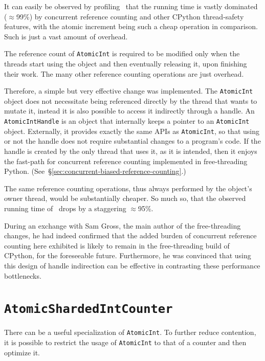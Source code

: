 It can easily be observed by profiling~\cite[examples/atomic\_int/counter.py]{cereggii} that the running time is vastly dominated ($\approx$99\%) by concurrent reference counting and other CPython thread-safety features, with the atomic increment being such a cheap operation in comparison.
Such is just a vast amount of overhead.

The reference count of \texttt{AtomicInt} is required to be modified only when the threads start using the object and then eventually releasing it, upon finishing their work.
The many other reference counting operations are just overhead.

Therefore, a simple but very effective change was implemented.
The \texttt{Atomic\-Int} object does not necessitate being referenced directly by the thread that wants to mutate it, instead it is also possible to access it indirectly through a handle.
An \texttt{AtomicIntHandle} is an object that internally keeps a pointer to an \texttt{AtomicInt} object.
Externally, it provides exactly the same APIs as \texttt{AtomicInt}, so that using or not the handle does not require substantial changes to a program's code.
If the handle is created by the only thread that uses it, as it is intended, then it enjoys the fast-path for concurrent reference counting implemented in free-threading Python.
(See~\S\ref{sec:concurrent-biased-reference-counting}.)

The same reference counting operations, thus always performed by the object's owner thread, would be substantially cheaper.
So much so, that the observed running time of~\cite[examples/atomic\_int/counter.py]{cereggii} drops by a staggering $\approx$95\%.

During an exchange with Sam Gross, the main author of the free-threading changes, he had indeed confirmed that the added burden of concurrent reference counting here exhibited is likely to remain in the free-threading build of CPython, for the foreseeable future.
Furthermore, he was convinced that using this design of handle indirection can be effective in contrasting these performance bottlenecks.


\section{\texttt{AtomicShardedIntCounter}}\label{sec:atomicshardedintcounter}

There can be a useful specialization of \texttt{AtomicInt}.
To further reduce contention, it is possible to restrict the usage of \texttt{AtomicInt} to that of a counter and then optimize it.

